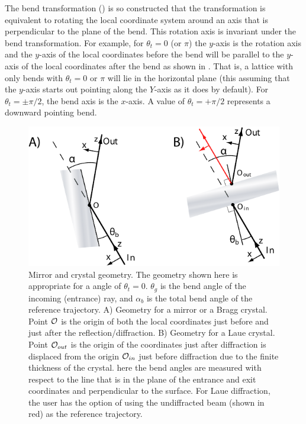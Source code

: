 The bend transformation () is so constructed that the
transformation is equivalent to rotating the local coordinate system
around an axis that is perpendicular to the plane of the bend. This
rotation axis is invariant under the bend transformation. For example,
for $\theta_t = 0$ (or $\pi$) the $y$-axis is the rotation axis and
the $y$-axis of the local coordinates before the bend will be parallel
to the $y$-axis of the local coordinates after the bend as shown in
. That is, a lattice with only bends with
$\theta_t = 0$ or $\pi$ will lie in the horizontal plane (this
assuming that the $y$-axis starts out pointing along the $Y$-axis as
it does by default).  For $\theta_t = \pm\pi/2$, the bend axis is the
$x$-axis. A value of $\theta_t = +\pi/2$ represents a downward
pointing bend.

\begin{figure}
  \centering \includegraphics{mirror.pdf} 
\caption[Mirror and crystal geometry] {Mirror and crystal geometry.
The geometry shown here is appropriate for a  angle of
$\theta_t = 0$.  $\theta_g$ is the bend angle of the incoming
(entrance) ray, and $\alpha_b$ is the total bend
angle of the reference trajectory. A) Geometry for a mirror or a Bragg
crystal. Point ${\cal O}$ is the origin of both the local coordinates
just before and just after the reflection/diffraction. B) Geometry for
a Laue crystal.  Point ${\cal O}_{out}$ is the origin of the coordinates
just after diffraction is displaced from the origin ${\cal O}_{in}$ just
before diffraction due to the finite thickness of the crystal. here
the bend angles are measured with respect to the line that is in
the plane of the entrance and exit coordinates and perpendicular to
the surface. For Laue diffraction, the user has the option of using
the undiffracted beam (shown in red) as the reference trajectory.
  }  
  \label{f:mirror}
\end{figure}

